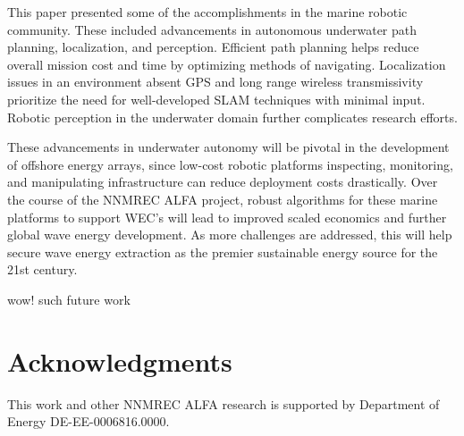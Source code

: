 \documentclass[letterpaper, 10 pt, conferences]{ieeeconf}  %
\begin{document}
This paper presented some of the accomplishments in the marine robotic community. These included advancements in autonomous underwater path planning, localization, and perception. Efficient path planning helps reduce overall mission cost and time by optimizing methods of navigating. Localization issues in an environment absent GPS and long range wireless transmissivity prioritize the need for well-developed SLAM techniques with minimal input. Robotic perception in the underwater domain further complicates research efforts. 

These advancements in underwater autonomy will be pivotal in the development of offshore energy arrays, since low-cost robotic platforms inspecting, monitoring, and manipulating infrastructure can reduce deployment costs drastically. Over the course of the NNMREC ALFA project, robust algorithms for these marine platforms to support WEC's will lead to improved scaled economics and further global wave energy development. As more challenges are addressed, this will help secure wave energy extraction as the premier sustainable energy source for the 21st century.

wow! such future work




\section*{Acknowledgments}
This work and other NNMREC ALFA research is supported by Department of Energy DE-EE-0006816.0000.

\ifCLASSOPTIONcaptionsoff
  \newpage
\fi


\nocite{huynh, geoffadapt, geoffuncertainty, colby, brekken1, brekken2, bosma, ballard, MAS}



\end{document}

